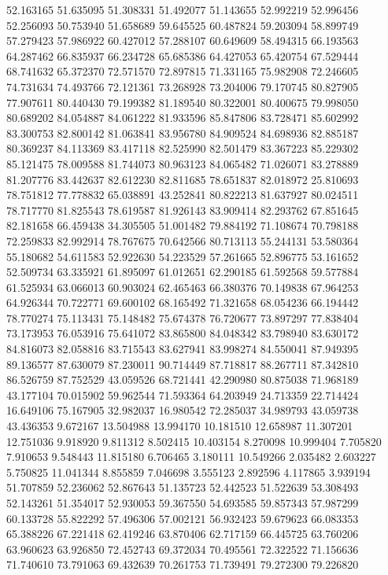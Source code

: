 52.163165
51.635095
51.308331
51.492077
51.143655
52.992219
52.996456
52.256093
50.753940
51.658689
59.645525
60.487824
59.203094
58.899749
57.279423
57.986922
60.427012
57.288107
60.649609
58.494315
66.193563
64.287462
66.835937
66.234728
65.685386
64.427053
65.420754
67.529444
68.741632
65.372370
72.571570
72.897815
71.331165
75.982908
72.246605
74.731634
74.493766
72.121361
73.268928
73.204006
79.170745
80.827905
77.907611
80.440430
79.199382
81.189540
80.322001
80.400675
79.998050
80.689202
84.054887
84.061222
81.933596
85.847806
83.728471
85.602992
83.300753
82.800142
81.063841
83.956780
84.909524
84.698936
82.885187
80.369237
84.113369
83.417118
82.525990
82.501479
83.367223
85.229302
85.121475
78.009588
81.744073
80.963123
84.065482
71.026071
83.278889
81.207776
83.442637
82.612230
82.811685
78.651837
82.018972
25.810693
78.751812
77.778832
65.038891
43.252841
80.822213
81.637927
80.024511
78.717770
81.825543
78.619587
81.926143
83.909414
82.293762
67.851645
82.181658
66.459438
34.305505
51.001482
79.884192
71.108674
70.798188
72.259833
82.992914
78.767675
70.642566
80.713113
55.244131
53.580364
55.180682
54.611583
52.922630
54.223529
57.261665
52.896775
53.161652
52.509734
63.335921
61.895097
61.012651
62.290185
61.592568
59.577884
61.525934
63.066013
60.903024
62.465463
66.380376
70.149838
67.964253
64.926344
70.722771
69.600102
68.165492
71.321658
68.054236
66.194442
78.770274
75.113431
75.148482
75.674378
76.720677
73.897297
77.838404
73.173953
76.053916
75.641072
83.865800
84.048342
83.798940
83.630172
84.816073
82.058816
83.715543
83.627941
83.998274
84.550041
87.949395
89.136577
87.630079
87.230011
90.714449
87.718817
88.267711
87.342810
86.526759
87.752529
43.059526
68.721441
42.290980
80.875038
71.968189
43.177104
70.015902
59.962544
71.593364
64.203949
24.713359
22.714424
16.649106
75.167905
32.982037
16.980542
72.285037
34.989793
43.059738
43.436353
9.672167
13.504988
13.994170
10.181510
12.658987
11.307201
12.751036
9.918920
9.811312
8.502415
10.403154
8.270098
10.999404
7.705820
7.910653
9.548443
11.815180
6.706465
3.180111
10.549266
2.035482
2.603227
5.750825
11.041344
8.855859
7.046698
3.555123
2.892596
4.117865
3.939194
51.707859
52.236062
52.867643
51.135723
52.442523
51.522639
53.308493
52.143261
51.354017
52.930053
59.367550
54.693585
59.857343
57.987299
60.133728
55.822292
57.496306
57.002121
56.932423
59.679623
66.083353
65.388226
67.221418
62.419246
63.870406
62.717159
66.445725
63.760206
63.960623
63.926850
72.452743
69.372034
70.495561
72.322522
71.156636
71.740610
73.791063
69.432639
70.261753
71.739491
79.272300
79.226820
